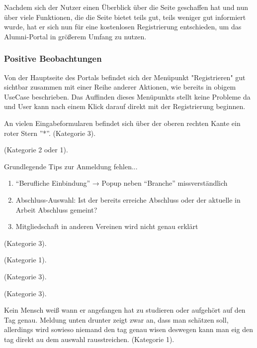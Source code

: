 Nachdem sich der Nutzer einen Überblick über die Seite geschaffen hat und nun über viele Funktionen, die die Seite
bietet teils gut, teils weniger gut informiert wurde, hat er sich nun für eine kostenlosen Registrierung entschieden, um das Alumni-Portal
in größerem Umfang zu nutzen.

\subsubsection*{Positive Beobachtungen}
Von der Hauptseite des Portals befindet sich der Menüpunkt "Registrieren" gut sichtbar zusammen mit einer Reihe anderer Aktionen,
wie bereits in obigem UseCase beschrieben. Das Auffinden dieses Menüpunkts stellt keine Probleme da und User kann nach einem Klick darauf direkt mit der Registrierung
beginnen.


{
An vielen Eingabeformularen befindet sich über der oberen rechten Kante ein roter Stern ”*”.
}
{  (Kategorie 3).
}
{
}





{
}
{  (Kategorie 2 oder 1).
}
{
} 

{
Grundlegende Tips zur Anmeldung fehlen...
\begin{enumerate}
	\item {“Berufliche Einbindung” → Popup neben “Branche” missverständlich}
	\item {Abschluss-Auswahl: Ist der bereits erreiche Abschluss oder der aktuelle in Arbeit Abschluss gemeint? }
	\item {Mitgliedschaft in anderen Vereinen wird nicht genau erklärt}
	
\end{enumerate}

}
{  (Kategorie 3).
}
{
} 


{
}
{  (Kategorie 1).
}
{
} 

{
}
{  (Kategorie 3).
}
{
} 

{
}
{  (Kategorie 3).
}
{
} 



{
 Kein Mensch weiß wann er angefangen hat zu studieren oder aufgehört auf den Tag genau. Meldung unten drunter
zeigt zwar an, dass man schätzen soll, allerdings wird sowieso niemand den tag genau wisen deswegen kann man eig den tag direkt au dem auswahl rausstreichen.
}
{  (Kategorie 1).
}
{
} 

